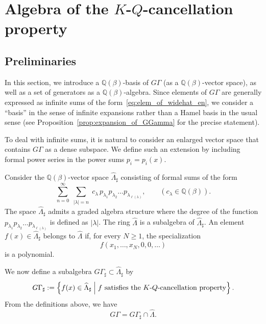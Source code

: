 \documentclass[dvipdfmx]{amsart}
\theoremstyle{definition}
\theoremstyle{remark}
\def\QQ{\mathord{\mathbb{Q}}}
\begin{document}
\section{Algebra of the \( K \)-\( Q \)-cancellation property}\label{sec:KQ}

\subsection{Preliminaries}

In this section, we introduce a \( \mathbb{Q}(\beta) \)-basis of \( G\Gamma \) (as a $\QQ(\beta)$-vector space), as well as a set of generators as a \( \mathbb{Q}(\beta) \)-algebra. 
Since elements of \( G\Gamma \) are generally expressed as infinite sums of the form~\eqref{eq:elem_of_widehat_en}, we consider a ``basis'' in the sense of infinite expansions rather than a Hamel basis in the usual sense (see Proposition~\ref{prop:expansion_of_GGamma} for the precise statement).

To deal with infinite sums, it is natural to consider an enlarged vector space that contains \( G\Gamma \) as a dense subspace. 
We define such an extension by including formal power series in the power sums \( p_i=p_i(x) \).

Consider the \( \mathbb{Q}(\beta) \)-vector space \( \widehat{\Lambda}_\sharp \) consisting of formal sums of the form
\[
\sum_{n=0}^\infty \sum_{
\substack{
|\lambda|=n
}
} c_\lambda\, p_{\lambda_1} p_{\lambda_2} \dots p_{\lambda_{\ell(\lambda)}}, \qquad (c_\lambda \in \mathbb{Q}(\beta)).
\]
The space \( \widehat{\Lambda}_\sharp \) admits a graded algebra structure where the degree of the function \( p_{\lambda_1} p_{\lambda_2} \dots p_{\lambda_{\ell(\lambda)}} \) is defined as \( |\lambda| \). 
The ring \( \widehat{\Lambda} \) is a subalgebra of \( \widehat{\Lambda}_\sharp \).
An element \( f(x) \in \widehat{\Lambda}_\sharp \) belongs to \( \widehat{\Lambda} \) if, for every \( N \geq 1 \), the specialization
\[
f(x_1, \dots, x_N, 0, 0, \dots)
\]
is a polynomial.

We now define a subalgebra \( G\Gamma_\sharp \subset \widehat{\Lambda}_\sharp \) by
\[
G\Gamma_\sharp := \left\{
f(x) \in \widehat{\Lambda}_\sharp \;\middle|\;
f \text{ satisfies the \( K \)-\( Q \)-cancellation property}
\right\}.
\]
From the definitions above, we have
\begin{equation}\label{eq:car_of_GGamma}
G\Gamma = G\Gamma_\sharp \cap \widehat{\Lambda}.
\end{equation}
\end{document}
